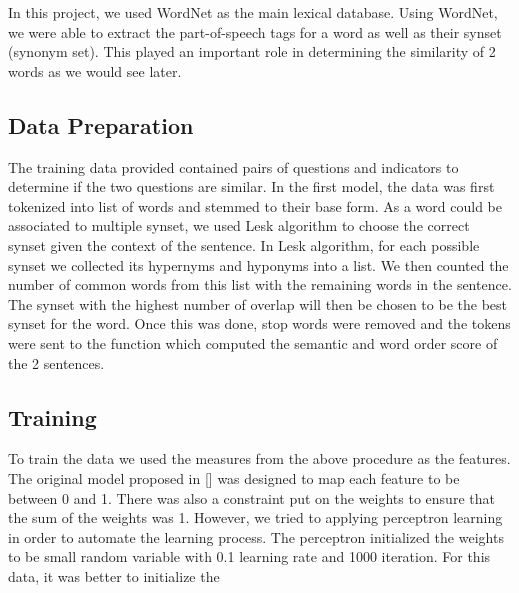 In this project, we used WordNet as the main lexical database. Using WordNet, we were able to extract the part-of-speech tags for a word as well as their synset (synonym set). This played an important role in determining the similarity of 2 words as we would see later.

\subsection{Data Preparation}
The training data provided contained pairs of questions and indicators to determine if the two questions are similar. In the first model, the data was first tokenized into list of words and stemmed to their base form. As a word could be associated to multiple synset, we used Lesk algorithm to choose the correct synset given the context of the sentence. In Lesk algorithm, for each possible synset we collected its hypernyms and hyponyms into  a list. We then counted the number of common words from this list with the remaining words in the sentence. The synset with the highest number of overlap will then be chosen to be the best synset for the word. Once this was done, stop words were removed and the tokens were sent to the function which computed the semantic and word order score of the 2 sentences. 

\subsection{Training}
To train the data we used the measures from the above procedure as the features. The original model proposed in [] was designed to map each feature to be between 0 and 1. There was also a constraint put on the weights to ensure that the sum of the weights was 1. However, we tried to applying perceptron learning in order to automate the learning process. The perceptron initialized the weights to be small random variable with 0.1 learning rate and 1000 iteration. For this data, it was better to initialize the 